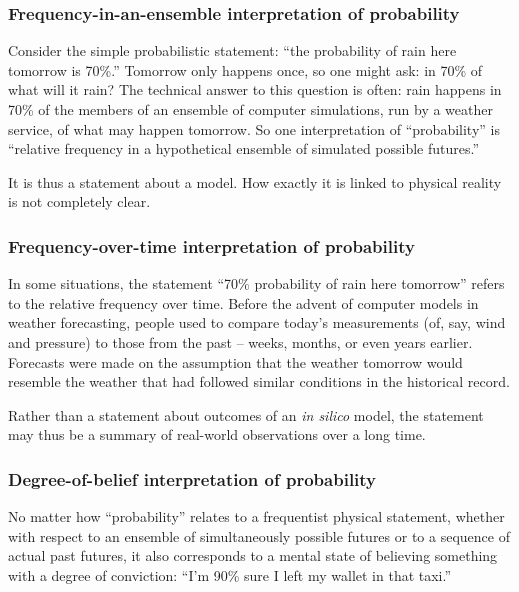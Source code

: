 \documentclass[%
	a4paper,
	abstract=true,	
	12pt,
	numbers=noenddot,
]{scrartcl}
\begin{document}
\subsubsection*{Frequency-in-an-ensemble interpretation of probability}
Consider the simple probabilistic statement: ``the probability of rain here tomorrow is 70\%.'' Tomorrow only happens once, so one might ask: in 70\% of what will it rain? The technical answer to this question is often: rain happens in 70\% of the members of an ensemble of computer simulations, run by a weather service, of what may happen tomorrow. So one interpretation of ``probability'' is ``relative frequency in a hypothetical ensemble of simulated possible futures.''

It is thus a statement about a model. How exactly it is linked to physical reality is not completely clear.


\subsubsection*{Frequency-over-time interpretation of probability}
In some situations, the statement ``70\% probability of rain here tomorrow'' refers to the relative frequency over time. Before the advent of computer models in weather forecasting, people used to compare today's measurements (of, say, wind and pressure) to those from the past -- weeks, months, or even years earlier. Forecasts were made on the assumption that the weather tomorrow would resemble the weather that had followed similar conditions in the historical record.

Rather than a statement about outcomes of an \textit{in silico} model, the statement may thus be a summary of real-world observations over a long time.

\subsubsection*{Degree-of-belief interpretation of probability}
No matter how ``probability'' relates to a frequentist physical statement, whether with respect to an ensemble of simultaneously possible futures or to a sequence of actual past futures, it also corresponds to a mental state of believing something with a degree of conviction: ``I'm 90\% sure I left my wallet in that taxi.''
\end{document}
